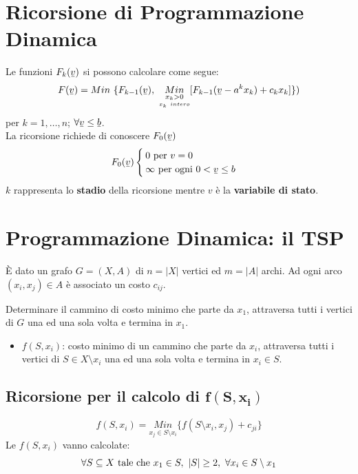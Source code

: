 \section{Ricorsione di Programmazione Dinamica}
Le funzioni $F_{k}(\ubar{v})$ si possono calcolare come segue:
\begin{equation*}
	F(\ubar{v})=Min\ \{F_{k-1}(\ubar{v}),\ \underset{\underset{x_{k}\ intero}{x_{k}>0}}{Min}[F_{k-1}(\ubar{v}-a^{k}x_{k})+c_{k}x_{k}]\})
\end{equation*}
per $k=1,\dots,n$; $\forall \ubar{v}\le \ubar{b}$.\\
La ricorsione richiede di conoscere $F_{0}(\ubar{v})$
\begin{equation*}
	F_{0}(\ubar{v})
	\begin{cases}
		0 \textnormal{ per }v={0}\\
		\infty \textnormal{ per ogni } 0 < \ubar{v}\le b
	\end{cases}
\end{equation*}
$k$ rappresenta lo \textbf{stadio} della ricorsione mentre $v$ è la \textbf{variabile di stato}.

\section{Programmazione Dinamica: il TSP}
È dato un grafo $G=(X,A)$ di $n=|X|$ vertici ed $m=|A|$ archi. Ad ogni arco $(x_{i},x_{j})\in A$ è associato un costo $c_{ij}$.

Determinare il cammino di costo minimo che parte da $x_{1}$, attraversa tutti i vertici di $G$ una ed una sola volta e termina in $x_{1}$.
\begin{itemize}
	\item[] $f(S,x_{i})$: costo minimo di un cammino che parte da $x_{i}$, attraversa tutti i vertici di $S\in X\setminus{x_{i}}$ una ed una sola volta e termina in $x_{i}\in S$.
\end{itemize}

\subsection{Ricorsione per il calcolo di $\boldsymbol{f(S,x_{i})}$}
\begin{equation*}
	f(S,x_{i})=\underset{x_{j}\in S\setminus{x_{i}}}{Min}\{f(S\setminus{x_{i}},x_{j})+c_{ji}\}
\end{equation*}
Le $f(S,x_{i})$ vanno calcolate:
\begin{equation*}
	\forall S\subseteq X \textnormal{ tale che }x_{1}\in S,\ |S|\ge 2,\ \forall x_{i}\in S\setminus{x_{1}}
\end{equation*}
